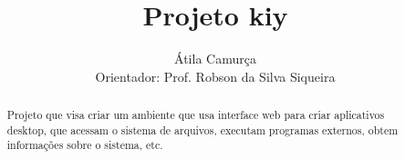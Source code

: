 \documentclass[a4paper,12pt]{article}
\title{Projeto kiy}
\author{Átila Camurça\\Orientador: Prof. Robson da Silva Siqueira}
\begin{document}
\maketitle

\begin{abstract}
Projeto que visa criar um ambiente que usa interface web para criar aplicativos desktop, que acessam o sistema de arquivos, executam programas externos, obtem informações sobre o sistema, etc.
\end{abstract}



\nocite{spa}
\nocite{deb}
\end{document}
